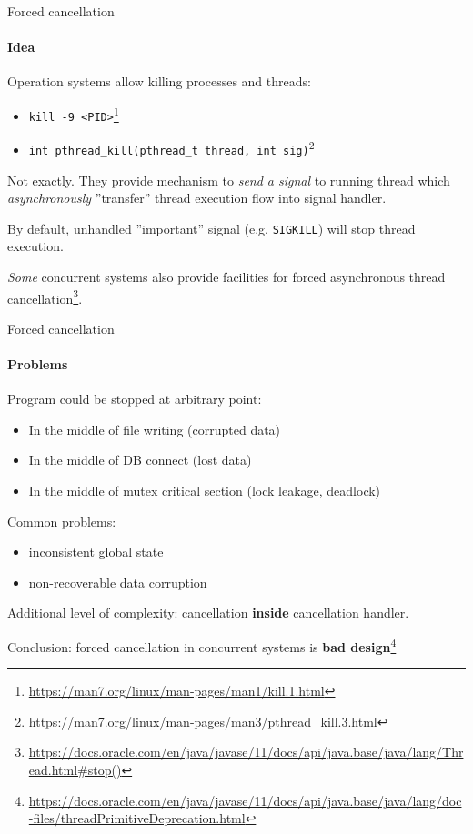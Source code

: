 \begin{frame}{Forced cancellation}
\framesubtitle{Idea}

Operation systems allow killing processes and threads: 
\begin{itemize}
    \item \texttt{kill -9 <PID>}\footnote{\tiny\url{https://man7.org/linux/man-pages/man1/kill.1.html}}
    \item \texttt{int pthread\_kill(pthread\_t thread, int sig)}\footnote{\tiny\url{https://man7.org/linux/man-pages/man3/pthread_kill.3.html}}

\end{itemize}

\pause

Not exactly. They provide mechanism to \textit{send a signal} to running thread which \textit{asynchronously} ''transfer'' thread execution flow into signal handler.

\pause

By default, unhandled ''important'' signal (e.g. \texttt{SIGKILL}) will stop thread execution.

\pause

\textit{Some} concurrent systems also provide facilities for forced asynchronous thread cancellation\footnote<4->{\tiny\url{https://docs.oracle.com/en/java/javase/11/docs/api/java.base/java/lang/Thread.html#stop()}}.

\end{frame}


\begin{frame}{Forced cancellation}
\framesubtitle{Problems}

Program could be stopped at arbitrary point:
\begin{itemize}
    \item In the middle of file writing (corrupted data)
    \item In the middle of DB connect (lost data)
    \item In the middle of mutex critical section (lock leakage, deadlock)
\end{itemize}

\pause

Common problems:
\begin{itemize}
    \item inconsistent global state
    \item non-recoverable data corruption
\end{itemize}

\pause
Additional level of complexity: cancellation \textbf{inside} cancellation handler.

\pause

Conclusion: forced cancellation in concurrent systems is \textbf{bad design}\footnote<4->{\tiny\url{https://docs.oracle.com/en/java/javase/11/docs/api/java.base/java/lang/doc-files/threadPrimitiveDeprecation.html}}

\end{frame}

